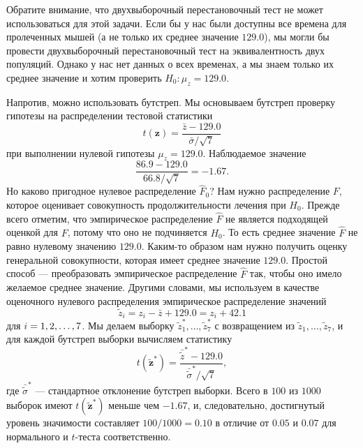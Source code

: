 Обратите внимание, что двухвыборочный перестановочный тест не может использоваться для этой задачи. Если бы у нас были доступны все времена для пролеченных мышей (а не только их среднее значение $129.0$), мы могли бы провести двухвыборочный перестановочный тест на эквивалентность двух популяций. Однако у нас нет данных о всех временах, а мы знаем только их среднее значение и хотим проверить $H_0: \mu_z = 129.0$.

Напротив, можно использовать бутстреп. Мы основываем бутстреп проверку гипотезы на распределении тестовой статистики
\begin{equation}\label{eq16.14}
    t(\mathbf{z}) = \frac{\bar{z}-129.0}{\bar{\sigma}/\sqrt{7}}
\end{equation}
при выполнении нулевой гипотезы $\mu_z = 129.0$. Наблюдаемое значение
\begin{equation}\label{eq16.15}
    \frac{86.9-129.0}{66.8/\sqrt{7}} = -1.67.
\end{equation}
Но каково пригодное нулевое распределение $\hat{F}_0$? Нам нужно распределение $F$, которое оценивает совокупность продолжительности лечения при $H_0$. Прежде всего отметим, что эмпирическое распределение $\hat{F}$ не является подходящей оценкой для $F$, потому что оно не подчиняется $H_0$. То есть среднее значение $\hat{F}$ не равно нулевому значению $129.0$. Каким-то образом нам нужно получить оценку генеральной совокупности, которая имеет среднее значение $129.0$. Простой способ --- преобразовать эмпирическое распределение $\hat{F}$ так, чтобы оно имело желаемое среднее значение. Другими словами, мы используем в качестве оценочного нулевого распределения эмпирическое распределение значений
\begin{equation}\label{eq16.16}
    \widetilde{z}_i = z_i - \bar{z} + 129.0 = z_i+42.1
\end{equation}
для $i = 1,2,\ldots,7$. Мы делаем выборку $\widetilde{z}^{*}_1,\ldots,\widetilde{z}^{*}_7$ с возвращением из $\widetilde{z}_1,\ldots,\widetilde{z}_7$, и для каждой бутстреп выборки вычисляем статистику
\begin{equation}\label{eq16.17}
    t(\mathbf{\widetilde{z}}^{*}) = \frac{\bar{\widetilde{z}}^{*}-129.0}{\bar{\widetilde{\sigma}}^{*}/\sqrt{7}},
\end{equation}
где $\bar{\widetilde{\sigma}}^{*}$ --- стандартное отклонение бутстреп выборки. Всего в $100$ из $1000$ выборок имеют $t(\mathbf{\widetilde{z}}^{*})$ меньше чем $-1.67$, и, следовательно, достигнутый уровень значимости составляет $100/1000 = 0.10$ в отличие от $0.05$ и $0.07$ для нормального и $t$-теста соответственно.

